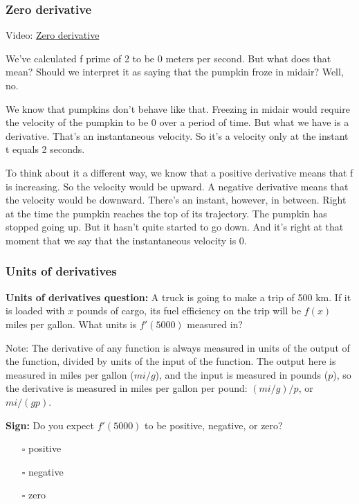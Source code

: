 \documentclass[pdftex, brazil, 12pt, twoside]{article}
\begin{document}
\subsubsection{Zero derivative}
\label{u1-what-zero-derivative}

Video: \href{https://www.youtube.com/watch?v=CA56Y0HTb6c}{Zero derivative}

We've calculated f prime of 2 to be 0 meters per second.
But what does that mean?
Should we interpret it as saying that the pumpkin froze
in midair?
Well, no.

We know that pumpkins don't behave like that.
Freezing in midair would require the velocity of the pumpkin
to be 0 over a period of time.
But what we have is a derivative.
That's an instantaneous velocity.
So it's a velocity only at the instant t equals 2 seconds.

To think about it a different way,
we know that a positive derivative
means that f is increasing.
So the velocity would be upward.
A negative derivative means that the velocity would be downward.
There's an instant, however, in between.
Right at the time the pumpkin reaches
the top of its trajectory.
The pumpkin has stopped going up.
But it hasn't quite started to go down.
And it's right at that moment that we
say that the instantaneous velocity is 0.

\subsubsection{Units of derivatives}
\label{u1-what-units}

\begin{exercise}
  \textbf{Units of derivatives question:} A truck is going to make a trip of 500 km.
  If it is loaded with $x$ pounds of cargo, its fuel efficiency on the trip will be $f(x)$
  miles per gallon. What units is $f'(5000)$ measured in?
\end{exercise}

Note: The derivative of any function is always measured in units of the output of
the function, divided by units of the input of the function. The output here is
measured in miles per gallon ($mi/g$), and the input is measured in pounds ($p$),
so the derivative is measured in miles per gallon per pound: $(mi/g)/p$, or
$mi/(gp)$.

\begin{exercise}
  \textbf{Sign:} Do you expect $f'(5000)$ to be positive, negative, or zero? 
\begin{itemize}[noitemsep]
\item[$\square$] positive
\item[$\square$] negative
\item[$\square$] zero
\end{itemize}
\end{exercise}
\end{document}
